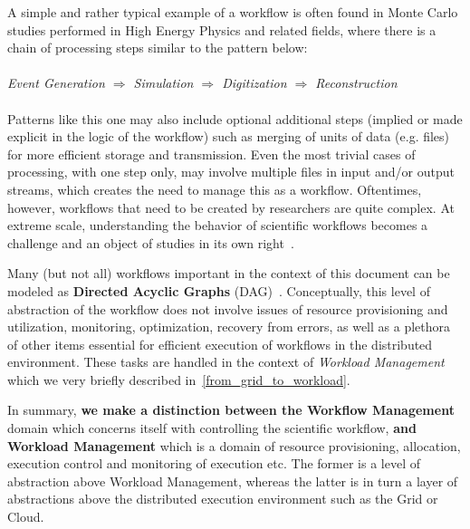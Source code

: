 A simple and rather typical example of a workflow is often found in Monte Carlo studies performed in High Energy Physics and related fields, where there is a chain of processing steps similar to the pattern below:
\\
\\
\textit{Event  Generation $\Longrightarrow$ Simulation $\Longrightarrow$ Digitization $\Longrightarrow$ Reconstruction}
\\
\\
Patterns like this one may also include optional additional steps (implied or made explicit in the logic of the workflow) such as merging of units of data (e.g. files) for more efficient storage and transmission.
Even the most trivial cases of processing, with one step only, may involve multiple files in input and/or output streams, which creates the need to manage this as a workflow. Oftentimes, however,
workflows that need to be created by researchers are quite complex. At extreme scale, understanding the behavior of scientific workflows becomes a challenge and an object of studies in its own right~\cite{panorama}.

Many (but not all) workflows important in the context of this document can be modeled as
\textbf{Directed Acyclic Graphs} (DAG)~\cite{pegasus,deft1,grid_workflow_taxonomy}.
Conceptually, this level of abstraction of the workflow does not  involve issues of resource provisioning and utilization, monitoring, optimization, recovery from errors, as well as a plethora of other items essential
for efficient execution of workflows in the distributed environment. These tasks are handled in the context of \textit{Workload Management} which we very briefly described in~\ref{from_grid_to_workload}.

In summary, \textbf{we make a distinction between the Workflow Management} domain which concerns itself with controlling the scientific workflow, \textbf{and Workload Management} which
is a domain of resource provisioning, allocation, execution control and monitoring of execution etc. The former is a level of abstraction above Workload Management, whereas the latter is in
turn a layer of abstractions above the distributed execution environment such as the Grid or Cloud.


